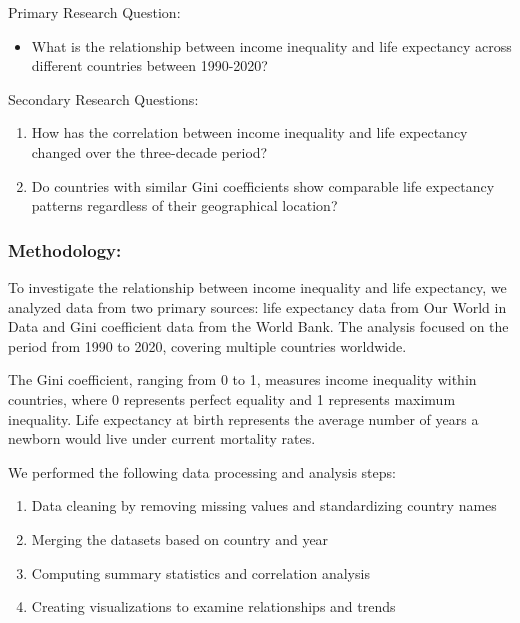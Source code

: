 \documentclass[
  11pt,
]{article}
\providecommand{\tightlist}{%
  \setlength{\itemsep}{0pt}\setlength{\parskip}{0pt}}\usepackage{longtable,booktabs,array}
\begin{document}
Primary Research Question:

\begin{itemize}
\tightlist
\item
  What is the relationship between income inequality and life expectancy
  across different countries between 1990-2020?
\end{itemize}

Secondary Research Questions:

\begin{enumerate}
\def\labelenumi{\arabic{enumi}.}
\item
  How has the correlation between income inequality and life expectancy
  changed over the three-decade period?
\item
  Do countries with similar Gini coefficients show comparable life
  expectancy patterns regardless of their geographical location?
\end{enumerate}

\subsubsection{Methodology:}\label{methodology}

To investigate the relationship between income inequality and life
expectancy, we analyzed data from two primary sources: life expectancy
data from Our World in Data and Gini coefficient data from the World
Bank. The analysis focused on the period from 1990 to 2020, covering
multiple countries worldwide.

The Gini coefficient, ranging from 0 to 1, measures income inequality
within countries, where 0 represents perfect equality and 1 represents
maximum inequality. Life expectancy at birth represents the average
number of years a newborn would live under current mortality rates.

We performed the following data processing and analysis steps:

\begin{enumerate}
\def\labelenumi{\arabic{enumi}.}
\item
  Data cleaning by removing missing values and standardizing country
  names
\item
  Merging the datasets based on country and year
\item
  Computing summary statistics and correlation analysis
\item
  Creating visualizations to examine relationships and trends
\end{enumerate}
\end{document}
